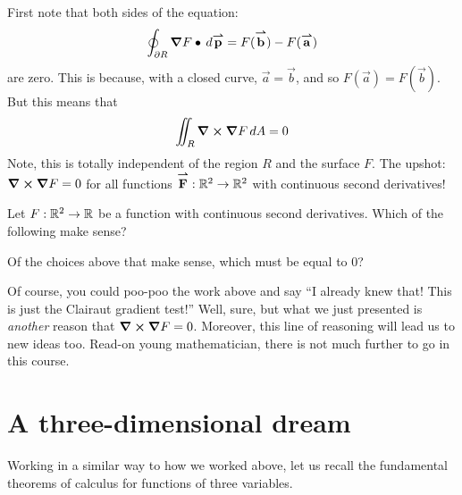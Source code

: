 \documentclass{ximera}
\begin{document}
First note that both sides of the equation:
\[
\oint_{\partial R} \boldsymbol\nabla F \bullet \,d {\overset{\boldsymbol{\rightharpoonup}}{\mathbf{p}}}\hspace{0in} = F({\overset{\boldsymbol{\rightharpoonup}}{\mathbf{b}}}\hspace{0in}) - F({\overset{\boldsymbol{\rightharpoonup}}{\mathbf{a}}}\hspace{0in})
\]
are zero. This is because, with a closed curve, $\vec{a}=\vec{b}$, and
so $F(\vec{a}) = F(\vec{b})$. But this means that
\[
\iint_R \boldsymbol\nabla\boldsymbol\times \boldsymbol\nabla F \,d A = 0
\]
Note, this is totally independent of the region $R$ and
the surface $F$. The upshot: $\boldsymbol\nabla\boldsymbol\times\boldsymbol\nabla F = 0$ for all functions
${\overset{\boldsymbol{\rightharpoonup}}{\mathbf{F}}}\hspace{0in}:\mathbb R^2\to\mathbb R^2$ with continuous second derivatives!

\begin{question}
  Let $F:\mathbb R^2\to \mathbb R$ be a function with continuous second
  derivatives. Which of the following make sense?
  \begin{selectAll}
  \end{selectAll}
  \begin{question}
    Of the choices above that make sense, which must be equal to $0$?
    \begin{prompt}
    \begin{selectAll}
    \end{selectAll}
    \end{prompt}
    \end{question}
\end{question}

Of course, you could poo-poo the work above and say ``I already knew
that!  This is just the Clairaut gradient test!'' Well, sure, but
what we just presented is \textit{another} reason that $\boldsymbol\nabla\boldsymbol\times \boldsymbol\nabla F
= 0$. Moreover, this line of reasoning will lead us to new ideas
too. Read-on young mathematician, there is not much further to go in
this course.



\section{A three-dimensional dream}

Working in a similar way to how we worked above, let us recall the fundamental theorems of calculus for functions of three variables.
\end{document}
